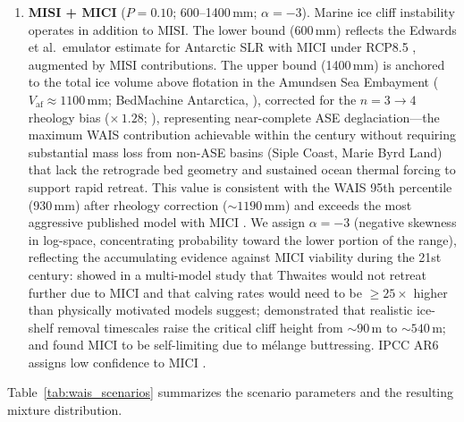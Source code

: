 \documentclass[11pt]{article}
\begin{document}
\begin{enumerate}
	\item[\textbf{S3.}] \textbf{MISI + MICI} ($P = 0.10$; 600--1400\,mm; $\alpha = -3$). Marine ice cliff instability \citep{Bassis2012, DeContoP2016} operates in addition to MISI. The lower bound (600\,mm) reflects the Edwards et al.\ emulator estimate for Antarctic SLR with MICI under RCP8.5 \citep[$\sim\!450$\,mm most likely, total Antarctic;][]{Edwards2019}, augmented by MISI contributions. The upper bound (1400\,mm) is anchored to the total ice volume above flotation in the Amundsen Sea Embayment ($V_{\mathrm{af}} \approx 1100$\,mm; BedMachine Antarctica, \citealp{Morlighem2020}), corrected for the $n = 3 \to 4$ rheology bias ($\times\,1.28$; \citealp{Martin2026, GetraerMorlighem2025}), representing near-complete ASE deglaciation---the maximum WAIS contribution achievable within the century without requiring substantial mass loss from non-ASE basins (Siple Coast, Marie Byrd Land) that lack the retrograde bed geometry and sustained ocean thermal forcing to support rapid retreat. This value is consistent with the \citet{Bamber2019} WAIS 95th percentile (930\,mm) after rheology correction ($\sim\!1190$\,mm) and exceeds the most aggressive published model with MICI \citep[$\sim\!640$--$1140$\,mm total Antarctic under RCP8.5;][]{DeContoP2016}. We assign $\alpha = -3$ (negative skewness in log-space, concentrating probability toward the lower portion of the range), reflecting the accumulating evidence against MICI viability during the 21st century: \citet{Morlighem2024} showed in a multi-model study that Thwaites would not retreat further due to MICI and that calving rates would need to be $\geq\!25\times$ higher than physically motivated models suggest; \citet{Clerc2019} demonstrated that realistic ice-shelf removal timescales raise the critical cliff height from $\sim\!90$\,m to $\sim\!540$\,m; and \citet{Schlemm2022} found MICI to be self-limiting due to m\'{e}lange buttressing. IPCC AR6 assigns low confidence to MICI \citep{Fox-Kemper2021}.
\end{enumerate}

\noindent Table~\ref{tab:wais_scenarios} summarizes the scenario parameters and the resulting mixture distribution.
\end{document}
